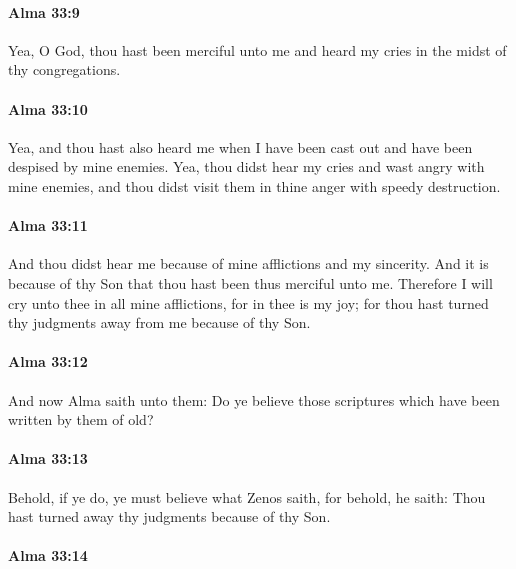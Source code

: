 		\paragraph{Alma 33:9} %
			\label{ALMA-33-9}

			Yea, O God, thou hast been merciful unto me
			and heard my cries in the midst of thy congregations.

		\paragraph{Alma 33:10} %
			\label{ALMA-33-10}

			Yea, and thou hast also heard me
			when I have been cast out and have been despised by mine enemies.
			Yea, thou didst hear my cries and wast angry with mine enemies,
			and thou didst visit them in thine anger with speedy destruction.

		\paragraph{Alma 33:11} %
			\label{ALMA-33-11}

			And thou didst hear me because of mine afflictions and my sincerity.
			And it is because of thy Son that thou hast been thus merciful unto me.
			Therefore I will cry unto thee in all mine afflictions,
			for in thee is my joy;
			for thou hast turned thy judgments away from me because of thy Son.

		\paragraph{Alma 33:12} %
			\label{ALMA-33-12}

			And now Alma saith unto them:
			Do ye believe those scriptures which have been written by them of old?

		\paragraph{Alma 33:13} %
			\label{ALMA-33-13}

			Behold, if ye do, ye must believe what Zenos saith,
			for behold, he saith:
			Thou hast turned away thy judgments because of thy Son.

		\paragraph{Alma 33:14} %
			\label{ALMA-33-14}

